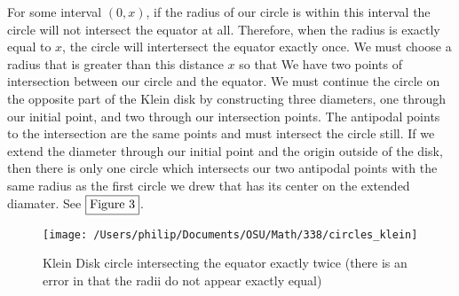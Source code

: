 \documentclass{article}
\begin{document}
For some interval $(0, x)$, if the radius of our circle is within this interval the circle will not intersect the equator at all. Therefore, when the radius is exactly equal to $x$, the circle will intertersect the equator exactly once. We must choose a radius that is greater than this distance $x$ so that We have two points of intersection between our circle and the equator. We must continue the circle on the opposite part of the Klein disk by constructing three diameters, one through our initial point, and two through our intersection points. The antipodal points to the intersection are the same points and must intersect the circle still. If we extend the diameter through our initial point and the origin outside of the disk, then there is only one circle which intersects our two antipodal points with the same radius as the first circle we drew that has its center on the extended diamater. See $\fbox{Figure 3}$.

\begin{figure}
	\caption{Klein Disk circle intersecting the equator exactly twice (there is an error in that the radii do not appear exactly equal)}
	\texttt{[image: /Users/philip/Documents/OSU/Math/338/circles\_klein]}
\end{figure}
\end{document}
